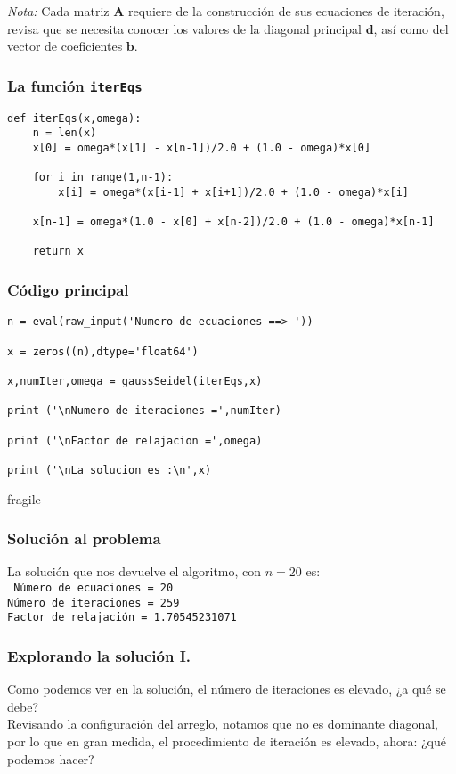 \begin{frame}
\emph{Nota: } Cada matriz $\mathbf{A}$ requiere de la construcción de sus ecuaciones de iteración, revisa que se necesita conocer los valores de la diagonal principal $\mathbf{d}$, así como del vector de coeficientes $\mathbf{b}$.
\end{frame}
\begin{frame}[fragile]
\frametitle{La función \texttt{iterEqs}}
\begin{lstlisting}[basicstyle=\linespread{0.9}\ttfamily\normalsize, columns=fullflexible]
def iterEqs(x,omega):
    n = len(x)
    x[0] = omega*(x[1] - x[n-1])/2.0 + (1.0 - omega)*x[0]
    
    for i in range(1,n-1):
        x[i] = omega*(x[i-1] + x[i+1])/2.0 + (1.0 - omega)*x[i]
    
    x[n-1] = omega*(1.0 - x[0] + x[n-2])/2.0 + (1.0 - omega)*x[n-1]

    return x
\end{lstlisting}
\end{frame}
\begin{frame}[fragile]
\frametitle{Código principal}
\begin{lstlisting}[basicstyle=\linespread{0.9}\ttfamily\normalsize, columns=fullflexible]
n = eval(raw_input('Numero de ecuaciones ==> '))

x = zeros((n),dtype='float64')

x,numIter,omega = gaussSeidel(iterEqs,x)

print ('\nNumero de iteraciones =',numIter)

print ('\nFactor de relajacion =',omega)

print ('\nLa solucion es :\n',x)
\end{lstlisting}
\end{frame}
\begin{frame}{fragile}
\frametitle{Solución al problema}
La solución que nos devuelve el algoritmo, con $n=20$ es:
\\
\medskip
\texttt{
Número de ecuaciones = 20 
\\
\medskip
Número de iteraciones = 259 
\\
\medskip
Factor de relajación = 1.70545231071
}
\end{frame}
\begin{frame}
\frametitle{Explorando la solución I.}
Como podemos ver en la solución, el número de iteraciones es elevado, ¿a qué se debe?
\\
\medskip
Revisando la configuración del arreglo, notamos que no es dominante diagonal, por lo que en gran medida, el procedimiento de iteración es elevado, ahora: ¿qué podemos hacer?
\end{frame}

